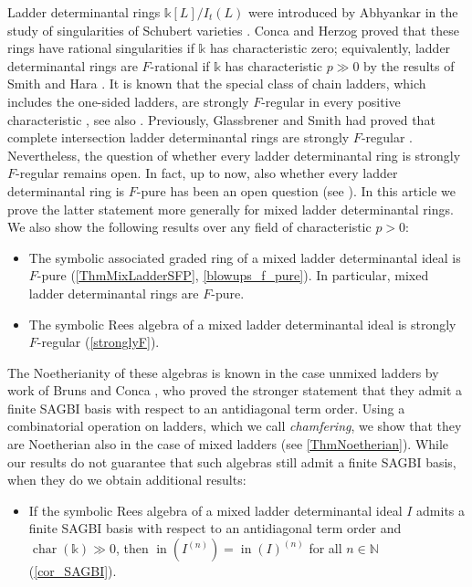 \documentclass[12pt]{amsart}
\theoremstyle{definition}
\renewcommand{\(}{\left(}
\renewcommand{\)}{\right)}
\newcommand{\NN}{\mathbb{N} }
\newcommand{\kk}{\mathbb{k}}
\newcommand{\IN}{\operatorname{in}}
\DeclareMathOperator{\chara}{{{char}}}
\renewcommand{\!}[1]{{\color{red}\text{\Huge$\star$ }#1}}
\begin{document}

Ladder determinantal rings $\kk[L]/I_t(L)$ were introduced %
by Abhyankar  in the study of singularities of Schubert varieties %
\cite{abhyankar1988enumerative}. 
Conca and Herzog \cite{concaherzog1997} proved that these rings have rational singularities if $\kk$ has characteristic zero; equivalently, ladder determinantal rings are $F$-rational if $\kk$ has characteristic $p\gg 0$ by the results of Smith and Hara \cite{SmithFrational, H98}. It is known that the special class of  chain ladders, which includes the one-sided ladders, are strongly $F$-regular in every positive characteristic \cite{concaherzog1997}, see also \cite{mehta1985frobenius}. Previously, Glassbrener and Smith had proved that complete intersection ladder determinantal rings are strongly $F$-regular \cite{GS}.  Nevertheless, the question of whether every  ladder determinantal ring  is strongly $F$-regular  remains open. In fact, up to now, also whether every ladder determinantal ring is $F$-pure has been an open question (see \cite[p. 122]{concaherzog1997}). In this article we prove the latter statement  more generally for mixed ladder determinantal rings.  We also show  the following  results over any field of characteristic $p>0$: %
\begin{itemize}
	\item The symbolic associated graded ring of a mixed ladder determinantal ideal is $F$-pure (\autoref{ThmMixLadderSFP}, \autoref{blowups_f_pure}). In particular, mixed ladder determinantal rings are $F$-pure.
	\item The symbolic Rees algebra of a mixed ladder determinantal ideal is strongly $F$-regular (\autoref{stronglyF}).
\end{itemize}
The Noetherianity of these algebras is known in the case unmixed ladders  by  work of Bruns and Conca  \cite[Theorem 4.1]{brunsconca98}, who proved the stronger statement that they admit a finite SAGBI basis with respect to an  antidiagonal term order. Using a combinatorial operation on ladders, which we call  {\it chamfering}, we show that they are Noetherian also in the case of mixed ladders (see \autoref{ThmNoetherian}). While our results do not guarantee that such algebras still admit a finite SAGBI basis, when they do we obtain additional results:
\begin{itemize}
	\item If the symbolic Rees algebra of a mixed ladder determinantal ideal $I$ admits a finite SAGBI basis with respect to an antidiagonal term order and $\chara(\kk)\gg 0$, then $\IN\left(I^{(n)}\right)=\IN(I)^{(n)}$ for all $n\in\NN$ (\autoref{cor_SAGBI}).
\end{itemize}
\end{document}
